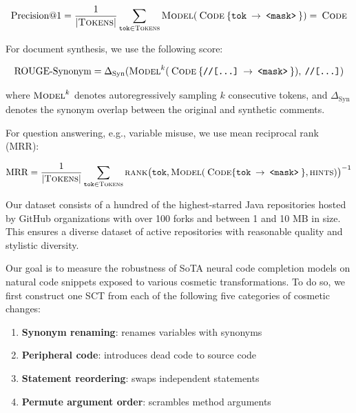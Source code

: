 \documentclass[usenames,dvipsnames]{article} %
\begin{document}
\begin{equation}
  \text{Precision@1} = \frac{1}{{|\textsc{Tokens}|}}\sum_{\texttt{tok}\in \textsc{Tokens}}\textsc{Model}(\:\textsc{Code}\:\{\texttt{tok}\:\rightarrow\:\texttt{<mask>}\:\}) = \:\textsc{Code}
\end{equation}

  For document synthesis, we use the following score:

\begin{equation}
\text{ROUGE-Synonym} = \Delta_{\text{Syn}}(\textsc{Model}^{k}(\:\textsc{Code}\:\{\texttt{//[...]}\:\rightarrow\:\texttt{<mask>}\:\}), \:\texttt{//[...]})
\end{equation}

  where $\textsc{Model}^{k}$ denotes autoregressively sampling $k$ consecutive tokens, and $\Delta_\text{Syn}$ denotes the synonym overlap between the original and synthetic comments.

  For question answering, e.g., variable misuse, we use mean reciprocal rank (MRR):

\begin{equation}
\text{MRR} = \frac{1}{|\textsc{Tokens}|} \sum_{\texttt{tok}\in\textsc{Tokens}} \textsc{rank}\big(\texttt{tok}, \textsc{Model}(\:\textsc{Code}\{\texttt{tok}\:\rightarrow\:\texttt{<mask>}\:\}, \textsc{hints})\big)^{-1}
\end{equation}

  Our dataset consists of a hundred of the highest-starred Java repositories hosted by GitHub organizations with over 100 forks and between 1 and 10 MB in size. This ensures a diverse dataset of active repositories with reasonable quality and stylistic diversity.

  Our goal is to measure the robustness of SoTA neural code completion models on natural code snippets exposed to various cosmetic transformations. To do so, we first construct one SCT from each of the following five categories of cosmetic changes:

  \begin{enumerate}[itemsep=1ex]
    \item \textbf{Synonym renaming}: renames variables with synonyms
    \item \textbf{Peripheral code}: introduces dead code to source code
    \item \textbf{Statement reordering}: swaps independent statements
    \item \textbf{Permute argument order}: scrambles method arguments
  \end{enumerate}
\end{document}
